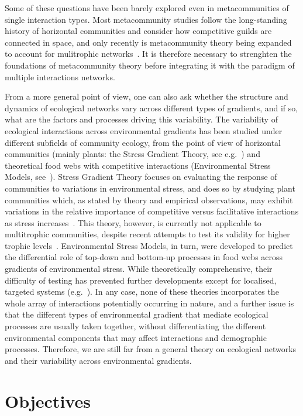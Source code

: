Some of these questions have been barely explored even in metacommunities of single interaction types. Most metacommunity studies follow the long-standing history of horizontal communities and consider how competitive guilds are connected in space, and only recently is metacommunity theory being expanded to account for mulitrophic networks~\citep{McCann2005, Fahimipour2014, Gravel2016a}. It is therefore necessary to strenghten the foundations of metacommunity theory before integrating it with the paradigm of multiple interactions networks.

From a more general point of view, one can also ask whether the structure and dynamics of ecological networks vary across different types of gradients, and if so, what are the factors and processes driving this variability. The variability of ecological interactions across environmental gradients has been studied under different subfields of community ecology, from the point of view of horizontal communities (mainly plants: the Stress Gradient Theory, see e.g.~\citealt{Maestre2009}) and theoretical food webs with competitive interactions (Environmental Stress Models, see~\citealt{Menge1987}). Stress Gradient Theory focuses on evaluating the response of communities to variations in environmental stress, and does so by studying plant communities which, as stated by theory and empirical observations, may exhibit variations in the relative importance of competitive versus facilitative interactions as stress increases~\citep{Callaway1997}. This theory, however, is currently not applicable to multitrophic communities, despite recent attempts to test its validity for higher trophic levels~\citep{Barrio2013}. Environmental Stress Models, in turn, were developed to predict the differential role of top-down and bottom-up processes in food webs across gradients of environmental stress. While theoretically comprehensive, their difficulty of testing has prevented further developments except for localised, targeted systems (e.g.~\citealt{Cheng2016a, Daleo2015}). In any case, none of these theories incorporates the whole array of interactions potentially occurring in nature, and a further issue is that the different types of environmental gradient that mediate ecological processes are usually taken together, without differentiating the different environmental components that may affect interactions and demographic processes. Therefore, we are still far from a general theory on ecological networks and their variability across environmental gradients.

\section{Objectives}

